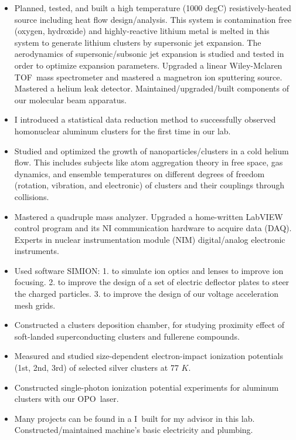 \documentclass{sebase}
\begin{document}
\begin{itemize}
\item Planned, tested, and built a high temperature (1000 degC)
resistively-heated source including heat flow design/analysis. This system
is contamination free (oxygen, hydroxide) and highly-reactive lithium metal
is melted in this system to generate lithium clusters by supersonic jet
expansion. The aerodynamics of supersonic/subsonic jet expansion is studied
and tested in order to optimize expansion parameters. Upgraded a linear
Wiley-Mclaren TOF\ mass spectrometer and mastered a magnetron ion sputtering
source. Mastered a helium leak detector. Maintained/upgraded/built
components of our molecular beam apparatus.

\item I introduced a statistical data reduction method to successfully
observed homonuclear aluminum clusters for the first time in our lab.

\item Studied and optimized the growth of nanoparticles/clusters in a cold
helium flow. This includes subjects like atom aggregation theory in free
space, gas dynamics, and ensemble temperatures on different degrees of
freedom (rotation, vibration, and electronic) of clusters and their
couplings through collisions.

\item Mastered a quadruple mass analyzer. Upgraded a home-written LabVIEW
control program and its NI communication hardware to acquire data (DAQ).
Experts in nuclear instrumentation module (NIM) digital/analog electronic
instruments.

\item Used software SIMION: 1. to simulate ion optics and lenses to improve
ion focusing. 2. to improve the design of a set of electric deflector plates
to steer the charged particles. 3. to improve the design of our voltage
acceleration mesh grids.

\item Constructed a clusters deposition chamber, for studying proximity
effect of soft-landed superconducting clusters and fullerene compounds.

\item Measured and studied size-dependent electron-impact ionization
potentials (1st, 2nd, 3rd) of selected silver clusters at 77 $\unit{K}$.\cite%
{Halder:2012:article-Double-and-triple-ionization-}

\item Constructed single-photon ionization potential experiments for
aluminum clusters with our OPO\ laser.

\item Many projects can be found in a \href{https://sites.google.com/site/vitalyslab/%
}{\underline{\color{blue}}} I\ built for my advisor in this
lab. Constructed/maintained machine's basic electricity and plumbing.
\end{itemize}
\end{document}
